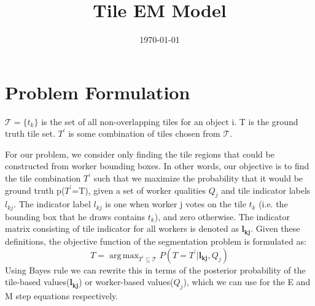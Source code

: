 \documentclass[12pt]{article}
\DeclareMathOperator*{\argmax}{arg\,max}
\begin{document}
\title{Tile EM Model}
\author{\today}
\date{}
\vspace{-50pt}
\maketitle
\vspace{-70pt}
\section{Problem Formulation}
\par $\mathcal{T}=\{t_k\}$ is the set of all non-overlapping tiles for an object i. T is the ground truth tile set. $T^\prime$ is some combination of tiles chosen from $\mathcal{T}$.
\par For our problem, we consider only finding the tile regions that could be constructed from worker bounding boxes. In other words, our objective is to find the tile combination $T^\prime$ such that we maximize the probability that it would be ground truth p($T^\prime$=T), given a set of worker qualities $Q_j$ and tile indicator labels $l_{kj}$.  The indicator label $l_{kj}$ is one when worker j votes on the tile $t_{k}$ (i.e. the bounding box that he draws contains $t_{k}$), and zero otherwise. The indicator matrix consisting of tile indicator for all workers is denoted as $\mathbf{l_{kj}}$. Given these definitions, the objective function of the segmentation problem is formulated as: 
\begin{equation}
T = \argmax_{T^\prime \subseteq \mathcal{T}}P(T=T^\prime |  \mathbf{l_{kj}},Q_j)
\label{objective}
\end{equation}
Using Bayes rule we can rewrite this in terms of the posterior probability of the tile-based values($\mathbf{l_{kj}}$) or worker-based values($Q_{j}$), which we can use for the E and M step equations respectively.
\end{document}

